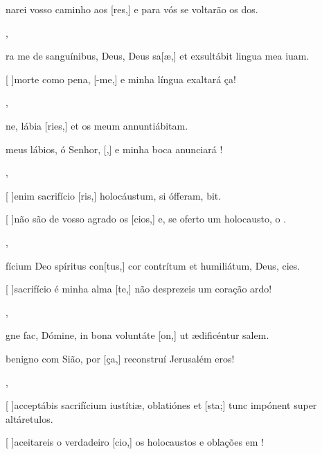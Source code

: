{    {\item {}narei vosso caminho aos [res,] e para vós se voltarão os dos.~\Antiphona},
  {\item {}ra me de sanguínibus, Deus, Deus sa[\-æ,] et exsultábit lingua mea iuam.~\Antiphona}%
    {\item {}[ ]{mor}te como pena, [-me,] e minha língua exaltará ça!~\Antiphona},
  {\item {}ne, lábia [ries,] et os meum annuntiábitam.~\Antiphona}%
    {\item {} meus lábios, ó Senhor, [,] e minha boca anunciará !~\Antiphona},
  {\item {}[ ]{e}nim sacrifício [ris,] holocáustum, si ófferam, bit.~\Antiphona}%
    {\item {}[ ]{não} são de vosso agrado os [cios,] e, se oferto um holocausto, o .~\Antiphona},
  {\item {}fícium Deo spíritus con[tus,] cor contrítum et humiliátum, Deus, cies.~\Antiphona}%
    {\item {}[ ]{sa}crifício é minha alma [te,] não desprezeis um coração ardo!~\Antiphona},
  {\item {}gne fac, Dómine, in bona voluntáte [\-on,] ut ædificéntur salem.~\Antiphona}%
    {\item {} benigno com Sião, por [ça,] reconstruí Jerusalém eros!~\Antiphona},
  {\item {}[ ]{ac}ceptábis sacrifícium iustítiæ, oblatiónes et [\-sta;] tunc impónent super altáretu\-los.~\Antiphona}%
    {\item {}[ ]{a}ceitareis o verdadeiro [cio,] os holocaustos e oblações em !~\Antiphona}
}